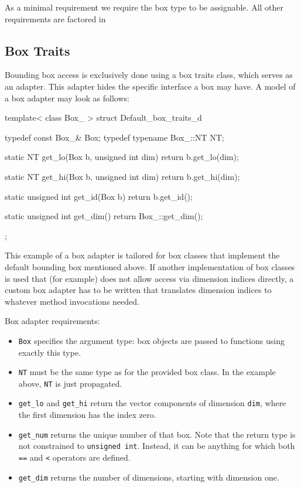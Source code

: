 As a minimal requirement we require the box type to be assignable.
All other requirements are factored in

\subsection{Box Traits}
Bounding box access is exclusively done using a box traits class, which serves as an adapter. This adapter hides the specific interface a box may have. A model of a box adapter may look as follows:
\begin{ccExampleCode}
template< class Box_ >
struct Default_box_traits_d {
    typedef const Box_&       Box;
    typedef typename Box_::NT NT;

    static NT get_lo(Box b, unsigned int dim)
    { return b.get_lo(dim); }

    static NT get_hi(Box b, unsigned int dim)
    { return b.get_hi(dim); }

    static unsigned int get_id(Box b)
    { return b.get_id();     }

    static unsigned int get_dim() { return Box_::get_dim(); }
};
\end{ccExampleCode}

This example of a box adapter is tailored for box classes that implement the default bounding box mentioned above. If another implementation of box classes is used that (for example) does not allow access via dimension indices directly, a custom box adapter has to be written that translates dimension indices to whatever method invocations needed.

Box adapter requirements:
\begin{itemize}
 \item \texttt{Box} specifies the argument type: box objects are passed to functions using exactly this type.
 \item \texttt{NT} must be the same type as for the provided box class. In the example above, \texttt{NT} is just propagated.
 \item \texttt{get\_lo} and \texttt{get\_hi} return the vector components of dimension \texttt{dim}, where the first  dimension has the index zero.
 \item \texttt{get\_num} returns the unique number of that box. Note that the return type is not constrained to \texttt{unsigned int}. Instead, it can be anything for which both \texttt{==} and \texttt{<} operators are defined.
 \item \texttt{get\_dim} returns the number of dimensions, starting with dimension one.
\end{itemize}

